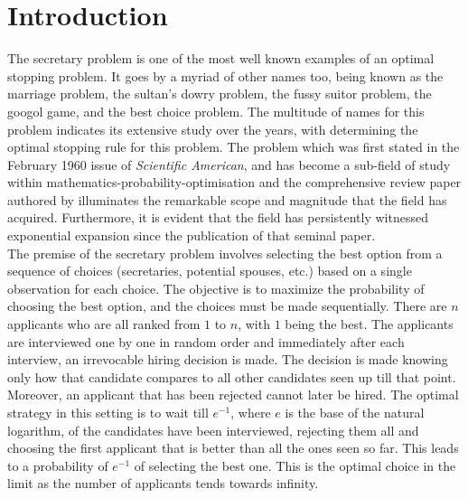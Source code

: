 \documentclass{article}
\begin{document}
\section{Introduction}

The secretary problem is one of the most well known examples of an optimal stopping problem. It goes by a myriad of other names too, being known as the marriage problem, the sultan's dowry problem, the fussy suitor problem, the googol game, and the best choice problem. The multitude of names for this problem indicates its extensive study over the years, with \cite{dynkin1963optimum} determining the optimal stopping rule for this problem. The problem which was first stated in the February 1960 issue of \textit{Scientific American}, and has become a sub-field of study within mathematics-probability-optimisation \cite{ferguson1989solved} and the comprehensive review paper authored by \cite{freeman1983secretary} illuminates the remarkable scope and magnitude that the field has acquired. Furthermore, it is evident that the field has persistently witnessed exponential expansion since the publication of that seminal paper.
\\[2ex]
The premise of the secretary problem involves selecting the best option from a sequence of choices (secretaries, potential spouses, etc.) based on a single observation for each choice. The objective is to maximize the probability of choosing the best option, and the choices must be made sequentially. There are $n$ applicants who are all ranked from $1$ to $n$, with $1$ being the best. The applicants are interviewed one by one in random order and immediately after each interview, an irrevocable hiring decision is made. The decision is made knowing only how that candidate compares to all other candidates seen up till that point. Moreover, an applicant that has been rejected cannot later be hired. The optimal strategy in this setting is to wait till $e^{-1}$, where $e$ is the base of the natural logarithm, of the candidates have been interviewed, rejecting them all and choosing the first applicant that is better than all the ones seen so far. This leads to a probability of $e^{-1}$ of selecting the best one. This is the optimal choice in the limit as the number of applicants tends towards infinity.
\\[2ex]
\end{document}
